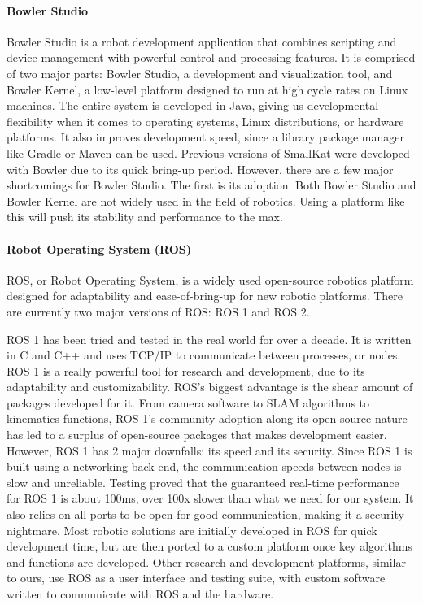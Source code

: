 \paragraph*{Bowler Studio}
Bowler Studio is a robot development application that combines scripting and device management with powerful control and processing features. It is comprised of two major parts: Bowler Studio, a development and visualization tool, and Bowler Kernel, a low-level platform designed to run at high cycle rates on Linux machines. The entire system is developed in Java, giving us developmental flexibility when it comes to operating systems, Linux distributions, or hardware platforms. It also improves development speed, since a library package manager like Gradle or Maven can be used. Previous versions of SmallKat were developed with Bowler due to its quick bring-up period. However, there are a few major shortcomings for Bowler Studio. The first is its adoption. Both Bowler Studio and Bowler Kernel are not widely used in the field of robotics. Using a platform like this will push its stability and performance to the max.

\paragraph*{Robot Operating System (ROS)}
ROS, or Robot Operating System, is a widely used open-source robotics platform designed for adaptability and ease-of-bring-up for new robotic platforms. There are currently two major versions of ROS: ROS 1 and ROS 2.

ROS 1 has been tried and tested in the real world for over a decade. It is written in C and C++ and uses TCP/IP to communicate between processes, or nodes. ROS 1 is a really powerful tool for research and development, due to its adaptability and customizability. ROS's biggest advantage is the shear amount of packages developed for it. From camera software to SLAM algorithms to kinematics functions, ROS 1's community adoption along its open-source nature has led to a surplus of open-source packages that makes development easier. However, ROS 1 has 2 major downfalls: its speed and its security. Since ROS 1 is built using a networking back-end, the communication speeds between nodes is slow and unreliable. Testing proved that the guaranteed real-time performance for ROS 1 is about 100ms, over 100x slower than what we need for our system. It also relies on all ports to be open for good communication, making it a security nightmare. Most robotic solutions are initially developed in ROS for quick development time, but are then ported to a custom platform once key algorithms and functions are developed. Other research and development platforms, similar to ours, use ROS as a user interface and testing suite, with custom software written to communicate with ROS and the hardware.

